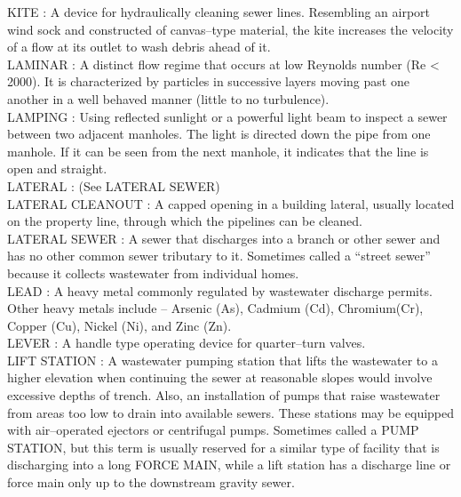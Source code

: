 KITE :  A device for hydraulically cleaning sewer lines. Resembling an airport wind sock and constructed of canvas–type material, the kite increases the velocity of a flow at its outlet to wash debris ahead of it. \\
\vspace{0.15cm}
LAMINAR :   A distinct flow regime that occurs at low Reynolds number (Re < 2000). It is characterized by particles in successive layers moving past one another in a well behaved manner (little to no turbulence).\\
\vspace{0.15cm}
LAMPING :  Using reflected sunlight or a powerful light beam to inspect a sewer between two adjacent manholes. The light is directed down the pipe from one manhole. If it can be seen from the next manhole, it indicates that the line is open and straight. \\
\vspace{0.15cm}
LATERAL :  (See LATERAL SEWER) \\
\vspace{0.15cm}
LATERAL CLEANOUT :  A capped opening in a building lateral, usually located on the property line, through which the pipelines can be cleaned. \\
\vspace{0.15cm}
LATERAL SEWER :  A sewer that discharges into a branch or other sewer and has no other common sewer tributary to it. Sometimes called a “street sewer” because it collects wastewater from individual homes. \\
\vspace{0.15cm}
LEAD :   A heavy metal commonly regulated by wastewater discharge permits. Other heavy metals include – Arsenic (As), Cadmium (Cd), Chromium(Cr), Copper (Cu), Nickel (Ni), and Zinc (Zn).\\
\vspace{0.15cm}
LEVER :   A handle type operating device for quarter–turn valves.\\
\vspace{0.15cm}
LIFT STATION :  A wastewater pumping station that lifts the wastewater to a higher elevation when continuing the sewer at reasonable slopes would involve excessive depths of trench. Also, an installation of pumps that raise wastewater from areas too low to drain into available sewers. These stations may be equipped with air–operated ejectors or centrifugal pumps. Sometimes called a PUMP STATION, but this term is usually reserved for a similar type of facility that is discharging into a long FORCE MAIN, while a lift station has a discharge line or force main only up to the downstream gravity sewer. \\
